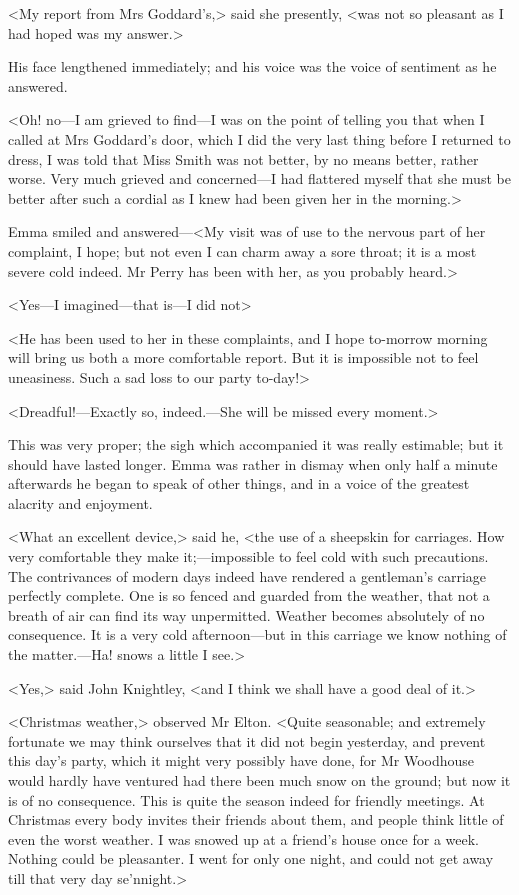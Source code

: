 <My report from Mrs Goddard's,> said she presently, <was not so pleasant as I had hoped was my answer.>

His face lengthened immediately; and his voice was the voice of sentiment as he answered.

<Oh! no—I am grieved to find—I was on the point of telling you that when I called at Mrs Goddard's door, which I did the very last thing before I returned to dress, I was told that Miss Smith was not better, by no means better, rather worse. Very much grieved and concerned—I had flattered myself that she must be better after such a cordial as I knew had been given her in the morning.>

Emma smiled and answered—<My visit was of use to the nervous part of her complaint, I hope; but not even I can charm away a sore throat; it is a most severe cold indeed. Mr Perry has been with her, as you probably heard.>

<Yes—I imagined—that is—I did not\longdash>

<He has been used to her in these complaints, and I hope to-morrow morning will bring us both a more comfortable report. But it is impossible not to feel uneasiness. Such a sad loss to our party to-day!>

<Dreadful!—Exactly so, indeed.—She will be missed every moment.>

This was very proper; the sigh which accompanied it was really estimable; but it should have lasted longer. Emma was rather in dismay when only half a minute afterwards he began to speak of other things, and in a voice of the greatest alacrity and enjoyment.

<What an excellent device,> said he, <the use of a sheepskin for carriages. How very comfortable they make it;—impossible to feel cold with such precautions. The contrivances of modern days indeed have rendered a gentleman's carriage perfectly complete. One is so fenced and guarded from the weather, that not a breath of air can find its way unpermitted. Weather becomes absolutely of no consequence. It is a very cold afternoon—but in this carriage we know nothing of the matter.—Ha! snows a little I see.>

<Yes,> said John Knightley, <and I think we shall have a good deal of it.>

<Christmas weather,> observed Mr Elton. <Quite seasonable; and extremely fortunate we may think ourselves that it did not begin yesterday, and prevent this day's party, which it might very possibly have done, for Mr Woodhouse would hardly have ventured had there been much snow on the ground; but now it is of no consequence. This is quite the season indeed for friendly meetings. At Christmas every body invites their friends about them, and people think little of even the worst weather. I was snowed up at a friend's house once for a week. Nothing could be pleasanter. I went for only one night, and could not get away till that very day se'nnight.>

